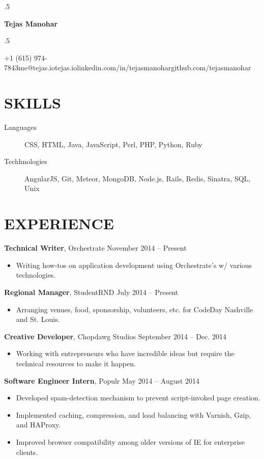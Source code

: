 \documentclass{res}
\newcommand*{\its}{\hspace{0.8cm}}
\begin{document}
\moveleft.5\hoffset\centerline{\Huge\bf Tejas Manohar}
\bigskip
\moveleft.5\hoffset\centerline{+1 (615) 974-7843\its{}me@tejas.io\its{}\its{}tejas.io\its{}linkedin.com/in/tejasmanohar\its{}github.com/tejasmanohar}

\section{SKILLS}

\begin{description}
  \item[Languages] CSS, HTML, Java, JavaScript, Perl, PHP, Python, Ruby
  \item[Techhnologies] AngularJS, Git, Meteor, MongoDB, Node.js, Rails, Redis, Sinatra, SQL, Unix
\end{description}

\section{EXPERIENCE}

{\bf Technical Writer}, Orchestrate \hfill November 2014 -- Present
\begin{itemize} \itemsep -2pt
  \item Writing how-tos on application development using Orchestrate's w/ various technologies.
\end{itemize}

{\bf Regional Manager}, StudentRND \hfill July 2014 -- Present
\begin{itemize} \itemsep -2pt
  \item Arranging venues, food, sponsorship, volunteers, etc. for CodeDay Nashville and St. Louis.
\end{itemize}

{\bf Creative Developer}, Chopdawg Studios \hfill September 2014 -- Dec. 2014
\begin{itemize} \itemsep -2pt
  \item Working with entrepreneurs who have incredible ideas but require the technical resources to make it happen.
\end{itemize}

{\bf Software Engineer Intern}, Populr \hfill May 2014 -- August 2014
\begin{itemize} \itemsep -2pt
  \item Developed spam-detection mechanism to prevent script-invoked page creation.
  \item Implemented caching, compression, and load balancing with Varnish, Gzip, and HAProxy.
  \item Improved browser compatibility among older versions of IE for enterprise clients.
\end{itemize}
\end{document}
